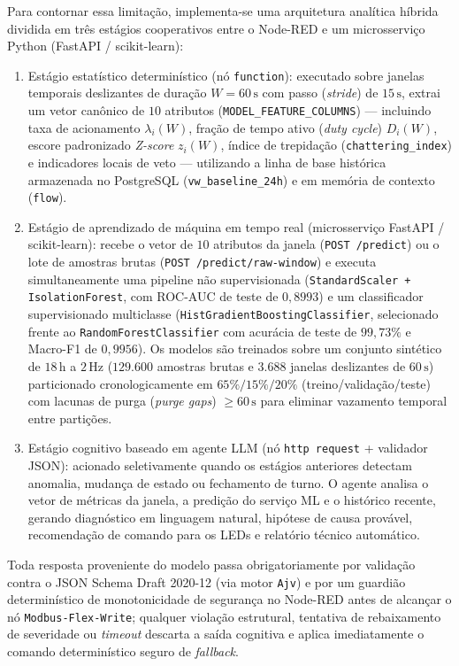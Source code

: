 Para contornar essa limitação, implementa-se uma arquitetura analítica híbrida dividida em três estágios cooperativos entre o Node-RED e um microsserviço Python (FastAPI / scikit-learn):
\begin{enumerate}
  \item Estágio estatístico determinístico (nó \texttt{function}): executado sobre janelas temporais deslizantes de duração $W = 60\,\text{s}$ com passo (\textit{stride}) de $15\,\text{s}$, extrai um vetor canônico de $10$ atributos (\texttt{MODEL\_FEATURE\_COLUMNS}) --- incluindo taxa de acionamento $\lambda_i(W)$, fração de tempo ativo (\textit{duty cycle}) $D_i(W)$, escore padronizado \textit{Z-score} $z_i(W)$, índice de trepidação (\texttt{chattering\_index}) e indicadores locais de veto --- utilizando a linha de base histórica armazenada no PostgreSQL (\texttt{vw\_baseline\_24h}) e em memória de contexto (\texttt{flow}).
  \item Estágio de aprendizado de máquina em tempo real (microsserviço FastAPI / scikit-learn): recebe o vetor de $10$ atributos da janela (\texttt{POST /predict}) ou o lote de amostras brutas (\texttt{POST /predict/raw-window}) e executa simultaneamente uma pipeline não supervisionada (\texttt{StandardScaler + IsolationForest}, com ROC-AUC de teste de $0{,}8993$) e um classificador supervisionado multiclasse (\texttt{HistGradientBoostingClassifier}, selecionado frente ao \texttt{RandomForestClassifier} com acurácia de teste de $99{,}73\%$ e Macro-F1 de $0{,}9956$). Os modelos são treinados sobre um conjunto sintético de $18\,\text{h}$ a $2\,\text{Hz}$ ($129.600$ amostras brutas e $3.688$ janelas deslizantes de $60\,\text{s}$) particionado cronologicamente em $65\%/15\%/20\%$ (treino/validação/teste) com lacunas de purga (\textit{purge gaps}) $\ge 60\,\text{s}$ para eliminar vazamento temporal entre partições.
  \item Estágio cognitivo baseado em agente LLM (nó \texttt{http request} + validador JSON): acionado seletivamente quando os estágios anteriores detectam anomalia, mudança de estado ou fechamento de turno. O agente analisa o vetor de métricas da janela, a predição do serviço ML e o histórico recente, gerando diagnóstico em linguagem natural, hipótese de causa provável, recomendação de comando para os LEDs e relatório técnico automático.
\end{enumerate}

Toda resposta proveniente do modelo passa obrigatoriamente por validação contra o JSON Schema Draft 2020-12 (via motor \texttt{Ajv}) e por um guardião determinístico de monotonicidade de segurança no Node-RED antes de alcançar o nó \texttt{Modbus-Flex-Write}; qualquer violação estrutural, tentativa de rebaixamento de severidade ou \textit{timeout} descarta a saída cognitiva e aplica imediatamente o comando determinístico seguro de \textit{fallback}.

